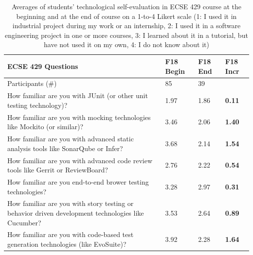 \documentclass[a4paper,11pt]{article}
\begin{document}
\begin{table}[htb]
\footnotesize
\begin{tabular}{@{}p{12cm}p{1cm}p{1cm}p{1cm}@{}}
\toprule
\textbf{ECSE 429 Questions} & 
\textbf{F18} \newline \textbf{Begin} & 
\textbf{F18} \newline \textbf{End} & 
\textbf{F18} \newline \textbf{Incr} \\ \toprule
Participants (\#) & 85 & 39  \\ \midrule
How familiar are you with JUnit (or other unit testing technology)? & 1.97 & 1.86 & \textbf{0.11} \\ \midrule

How familiar are you with mocking technologies like Mockito (or similar)? & 3.46 & 2.06 & \textbf{1.40} \\ \midrule

How familiar are you with advanced static analysis tools like SonarQube or Infer? & 3.68 & 2.14 & \textbf{1.54} \\ \midrule

How familiar are you with advanced code review tools like Gerrit or ReviewBoard? & 2.76 & 2.22 & \textbf{0.54} \\ \midrule

How familiar are you end-to-end brower testing technologies? & 3.28 & 2.97 & \textbf{0.31}  \\ \midrule

How familiar are you with story testing or behavior driven development technologies like Cucumber? &
3.53 & 2.64 & \textbf{0.89}  \\ \midrule


How familiar are you with code-based test generation technologies (like EvoSuite)?
& 3.92 & 2.28 & \textbf{1.64} \\ \midrule
\bottomrule
\end{tabular}

\caption{Averages of students' technological self-evaluation in ECSE 429 course at the beginning and at the end of course on a 1-to-4 Likert scale (1: I used it in industrial project during my work or an internship, 2: I used it in a software engineering project in one or more courses, 3: I learned about it in a tutorial, but have not used it on my own, 4:
I do not know about it)}
\label{tab:tech-eval-ecse429}
\end{table}
\end{document}
